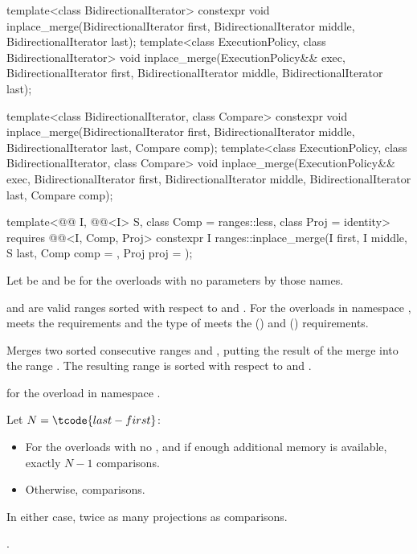 %
\begin{itemdecl}
template<class BidirectionalIterator>
  constexpr void inplace_merge(BidirectionalIterator first,
                               BidirectionalIterator middle,
                               BidirectionalIterator last);
template<class ExecutionPolicy, class BidirectionalIterator>
  void inplace_merge(ExecutionPolicy&& exec,
                     BidirectionalIterator first,
                     BidirectionalIterator middle,
                     BidirectionalIterator last);

template<class BidirectionalIterator, class Compare>
  constexpr void inplace_merge(BidirectionalIterator first,
                               BidirectionalIterator middle,
                               BidirectionalIterator last, Compare comp);
template<class ExecutionPolicy, class BidirectionalIterator, class Compare>
  void inplace_merge(ExecutionPolicy&& exec,
                     BidirectionalIterator first,
                     BidirectionalIterator middle,
                     BidirectionalIterator last, Compare comp);

template<@@ I, @@<I> S, class Comp = ranges::less,
         class Proj = identity>
  requires @@<I, Comp, Proj>
  constexpr I ranges::inplace_merge(I first, I middle, S last, Comp comp = {}, Proj proj = {});
\end{itemdecl}

\begin{itemdescr}
\pnum
Let  be 
and  be 
for the overloads with no parameters by those names.

\pnum
\expects
{} and  are valid ranges
sorted with respect to  and .
For the overloads in namespace ,
 meets
the  requirements and
the type of  meets
the  () and
 () requirements.

\pnum
\effects
Merges two sorted consecutive ranges
 and ,
putting the result of the merge into the range .
The resulting range is sorted with respect to  and .

\pnum
\returns
{} for the overload in namespace .

\pnum
\complexity
Let $N = \tcode{last - first}$:
\begin{itemize}
\item
  For the overloads with no , and
  if enough additional memory is available, exactly $N - 1$ comparisons.
\item
  Otherwise,  comparisons.
\end{itemize}
In either case, twice as many projections as comparisons.

\pnum
\remarks
{}.
\end{itemdescr}

